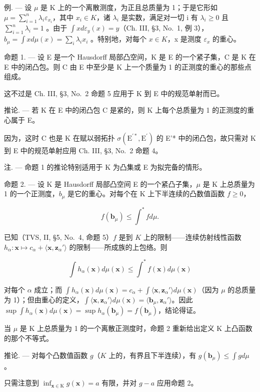 例. --- 设 \(\mu\) 是 K 上的一个离散测度，为正且总质量为 1；于是它形如 \(\mu = \sum_{i=1}^{n} \lambda_i \varepsilon_{x_i}\)，其中 \(x_i \in K\)，诸 \(\lambda_i\) 是实数，满足对一切 i 有 \(\lambda_i \geqslant 0\) 且 \(\sum_{i=1}^{n} \lambda_i = 1\) 。由于 \(\int x d\varepsilon_y(x) = y\)（Ch. III, §3, No.~1, 例 3），\(b_\mu = \int x d\mu(x) = \sum_{i} \lambda_i x_i\) 。特别地，对每个 \(x \in K\)，x 是测度 \(\varepsilon_x\) 的重心。

命题 1. --- 设 E 是一个 Hausdorff 局部凸空间，K 是 E 的一个紧子集，C 是 K 在 E 中的闭凸包。则 C 由 E 中至少是 K 上一个质量为 1 的正测度的重心的那些点组成。

这不过是 Ch. III, §3, No.~2 命题 5 应用于 K 到 E 中的规范单射而已。

推论. --- 若 K 在 E 中的闭凸包 C 是紧的，则 K 上每个总质量为 1 的正测度的重心属于 E。

因为，这时 C 也是 K 在赋以弱拓扑 \(\sigma (\mathrm{E}^{\prime *},\mathrm{E}^{\prime})\) 的 E'* 中的闭凸包，故只需对 K 到 E 中的规范单射应用 Ch. III, §3, No.~2 命题 4。

注. --- 命题 1 的推论特别适用于 K 为凸集或 E 为拟完备的情形。

命题 2. --- 设 K 是 Hausdorff 局部凸空间 E 的一个紧凸子集，\(\mu\) 是 K 上总质量为 1 的一个正测度，\(b_{\mu}\) 是它的重心。对每个在 K 上下半连续的凸数值函数 \(f \geqslant 0\)，

\[
f (\mathbf {b} _ {\mu}) \leqslant \int^ {*} f d \mu .
\]

已知（TVS, II, §5, No.~4, 命题 5）\(f\) 是到 \(K\) 上的限制——连续仿射线性函数 \(h_{\alpha} : \mathbf{x} \mapsto c_{\alpha} + \langle \mathbf{x}, \mathbf{z}_{\alpha}' \rangle\) 的限制——所成族的上包络。则

\[
\int h _ {\alpha} (\mathbf {x}) d \mu (\mathbf {x}) \leqslant \int^ {*} f (\mathbf {x}) d \mu (\mathbf {x})
\]

对每个 \(\alpha\) 成立；而 \(\int h_{\alpha}(\mathbf{x}) d\mu (\mathbf{x}) = c_{\alpha} + \int \langle \mathbf{x}, \mathbf{z}_{\alpha}' \rangle d\mu (\mathbf{x})\)（因为 \(\mu\) 的总质量为 1）；但由重心的定义，\(\int \langle \mathbf{x}, \mathbf{z}_{\alpha}' \rangle d\mu (\mathbf{x}) = \langle \mathbf{b}_{\mu}, \mathbf{z}_{\alpha}' \rangle\)。因此 \(\sup \int h_{\alpha}(\mathbf{x}) d\mu (\mathbf{x}) = \sup h_{\alpha}(\mathbf{b}_{\mu}) = f(\mathbf{b}_{\mu})\)，结论得证。

当 \(\mu\) 是 K 上总质量为 1 的一个离散正测度时，命题 2 重新给出定义 K 上凸函数的那个不等式。

推论. --- 对每个凸数值函数 \(g\)（\(K\) 上的，有界且下半连续），有 \(g(\mathbf{b}_{\mu}) \leqslant \int g d\mu\) 。

只需注意到 \(\inf_{\mathbf{x} \in \mathrm{K}} g(\mathbf{x}) = a\) 有限，并对 \(g - a\) 应用命题 2。
